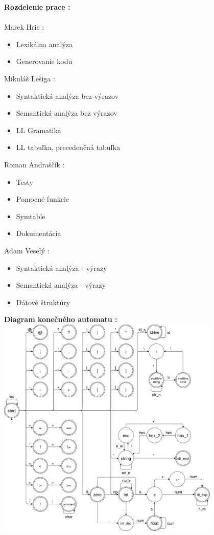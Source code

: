 \documentclass[12pt]{article}
\begin{document}
\noindent \Large \textbf{Rozdelenie prace :} \\
\noindent\makebox[\linewidth]{\rule{\textwidth}{0.4pt}}
\newline \\
\large Marek Hric : 
\normalsize
\begin{itemize}
\item Lexikálna analýza
\item Generovanie kodu
\end{itemize}
\large Mikuláš Lešiga :
\normalsize
\begin{itemize}
\item Syntaktická analýza bez výrazov
\item Semantická analýza bez výrazov
\item LL Gramatika
\item LL tabuľka, precedenčná tabuľka
\end{itemize}
\large Roman Andraščík :
\normalsize
\begin{itemize}
\item Testy
\item Pomocné funkcie
\item Symtable
\item Dokumentácia
\end{itemize}
\large Adam Veselý :
\normalsize
\begin{itemize}
\item Syntaktická analýza - výrazy
\item Semantická analýza - výrazy
\item Dátové štruktúry
\end{itemize}
 
\newpage

\noindent \Large \textbf{Diagram konečného automatu :}
\newline \\
\includegraphics[width=0.8\textwidth,scale=0.5]{fsm}
\newline \\
\end{document}
